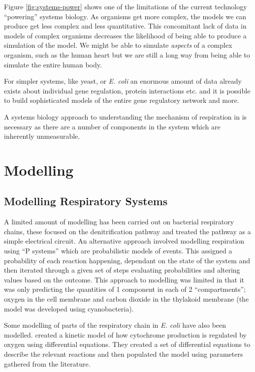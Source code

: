 Figure \ref{fig:systems-power} shows one of the limitations of the current technology ``powering'' systems biology. As organisms get more complex, the models we can produce get less complex and less quantitative\cite{Kahlem2006}. This concomitant lack of data in models of complex organisms decreases the likelihood of being able to produce a simulation of the model. We might be able to simulate \textit{aspects} of a complex organism, such as the human heart\cite{Crampin2004} but we are still a long way from being able to simulate the entire human body.

For simpler systems, like yeast, or \textit{E. coli} an enormous amount of data already exists about individual gene regulation, protein interactions etc. and it is possible to build sophisticated models of the entire gene regulatory network and more\cite{Barabasi2004,Peercy2006}.

A systems biology approach to understanding the mechanism of respiration in \Nsm{} is necessary as there are a number of components in the system which are inherently unmeasurable.

\section{Modelling}

\subsection{Modelling Respiratory Systems}

A limited amount of modelling has been carried out on bacterial respiratory chains, these focused on the denitrification pathway and treated the pathway as a simple electrical circuit\cite{Almeida1997}. An alternative approach involved modelling respiration using ``P systems'' which are probabilistic models of events. This assigned a probability of each reaction happening, dependant on the state of the system and then iterated through a given set of steps evaluating probabilities and altering values based on the outcome\cite{Cavaliere2006}. This approach to modelling was limited in that it was only predicting the quantities of 1 component in each of 2 ``compartments''; oxygen in the cell membrane and carbon dioxide in the thylakoid membrane (the model was developed using cyanobacteria).

Some modelling of parts of the respiratory chain in \textit{E. coli} have also been modelled. \citet{Peercy2006} created a kinetic model of how cytochrome production is regulated by oxygen using differential equations. They created a set of differential equations to describe the relevant reactions and then populated the model using parameters gathered from the literature.

